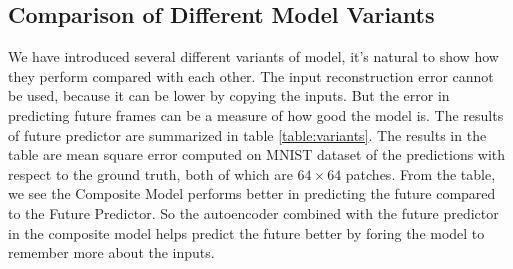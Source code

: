 \documentclass[twoside,a4paper,article]{combine}
\begin{document}
\subsection{Comparison of Different Model Variants}
We have introduced several different variants of model, it's natural to show how they perform compared with each other. The input
reconstruction error cannot be used, because it can be lower by copying the inputs. But the error in predicting future frames can be a
measure of how good the model is. The results of future predictor are summarized in table \ref{table:variants}. 
The results in the table are mean square error computed on MNIST dataset of the predictions with respect to the ground truth, both of
which are $64\times64$ patches. From the table, we see the Composite Model performs better in predicting the future compared to the Future
Predictor. So the autoencoder combined with the future predictor in the composite model helps predict the future better by foring the model
to remember more about the inputs. 






\end{document}
